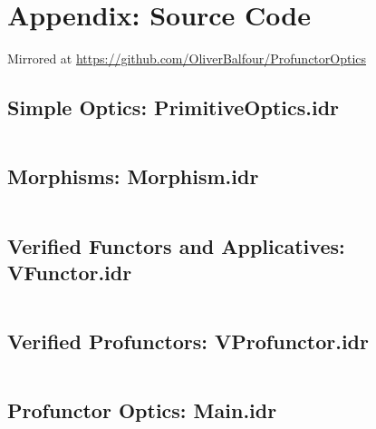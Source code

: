 \documentclass[]{report}
\begin{document}
\printbibliography

\newpage
\section{Appendix: Source Code}

Mirrored at \href{https://github.com/OliverBalfour/ProfunctorOptics}{https://github.com/OliverBalfour/ProfunctorOptics}

\subsection{Simple Optics: PrimitiveOptics.idr}

\inputminted[breaklines,linenos]{idris}{../src/Primitive/PrimitiveOptics.idr}

\subsection{Morphisms: Morphism.idr}

\inputminted[breaklines,linenos]{idris}{../src/Category/Morphism.idr}

\subsection{Verified Functors and Applicatives: VFunctor.idr}

\inputminted[breaklines,linenos]{idris}{../src/Category/VFunctor.idr}

\subsection{Verified Profunctors: VProfunctor.idr}

\inputminted[breaklines,linenos]{idris}{../src/Category/VProfunctor.idr}

\subsection{Profunctor Optics: Main.idr}

\inputminted[breaklines,linenos]{idris}{../src/Main.idr}
\end{document}
